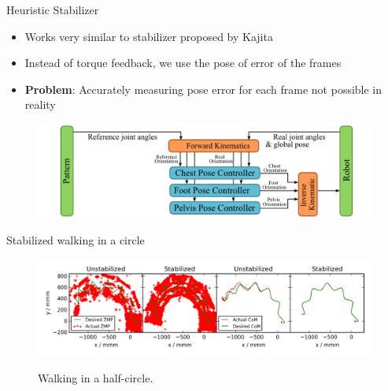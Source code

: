 \begin{frame}{Heuristic Stabilizer}

\begin{itemize}
\itemsep1pt\parskip0pt
\item
  Works very similar to stabilizer proposed by Kajita
\item
  Instead of torque feedback, we use the pose of error of the frames
\item
  \textbf{Problem}: Accurately measuring pose error for each frame not
  possible in reality
\end{itemize}

\begin{figure}
  \begin{center}
     \includegraphics[width=\textwidth]{images/heuristic_architechture.png}
  \end{center}
\end{figure}

\end{frame}

\begin{frame}{Stabilized walking in a circle}

\begin{figure}
  \begin{center}
     \includegraphics[width=\textwidth]{images/undisturbed_circle.png}
  \end{center}
\end{figure}

\begin{figure}
  \begin{center}
  \end{center}
  \caption{Walking in a half-circle.}
\end{figure}

\end{frame}

